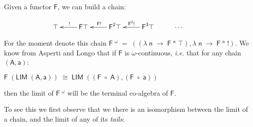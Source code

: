 \documentclass[a4paper]{article}
\newcommand{\Conid}[1]{\mathit{#1}}
\newcommand{\Varid}[1]{\mathit{#1}}
\renewcommand\Varid[1]{\mathord{\textsf{#1}}}
\let\Conid\Varid
\begin{document}
Given a functor \ensuremath{\Conid{F}}, we can build a chain:

\[
\xymatrix{
\ensuremath{\top} &
\ar[l]_{\ensuremath{\mathbin{!}}}
\ensuremath{\Conid{F}} \ensuremath{\top} &
\ar[l]_{\ensuremath{\Conid{F}} \ensuremath{\mathbin{!}}}
\ensuremath{\Conid{F}}^{\ensuremath{\Varid{2}}} \ensuremath{\top} &
\ar[l]_{\ensuremath{\Conid{F}}^{\ensuremath{\Varid{2}}} \ensuremath{\mathbin{!}}}
\ensuremath{\Conid{F}}^{\ensuremath{\Varid{3}}} \ensuremath{\top} &
\cdots &
} 
\]


\noindent
For the moment denote this chain \ensuremath{\Conid{F}\;\!^{\omega}\;\mathrel{=}\;((\lambda\;\Varid{n}\;\rightarrow\;\Conid{F}\;\!^{\Varid{n}}\;\top),\lambda\;\Varid{n}\;\rightarrow\;\Conid{F}\;\!^{\Varid{n}}\;\mathbin{!})}. 
We know from Asperti and Longo \cite{aspertilongo} that if \ensuremath{\Conid{F}} is 
$\omega$-continuous, \emph{i.e.} that for any chain \ensuremath{(\Conid{A},\Varid{a})}:

\ensuremath{\Conid{F}\;(\Conid{LIM}\;(\Conid{A},\Varid{a}))\;\cong\;\Conid{LIM}\;((\Conid{F}\;\ensuremath{\mbox{$\circ$}}\;\Conid{A}),(\Conid{F}\;\ensuremath{\mbox{$\circ$}}\;\Varid{a}))}

\noindent
then the limit of \ensuremath{\Conid{F}\;\!^{\omega}} will be the terminal co-algebra of \ensuremath{\Conid{F}}. 

To see this we first observe that we there is an isomorphism between the limit of a chain, and the limit of any of its \emph{tails}:
\end{document}
